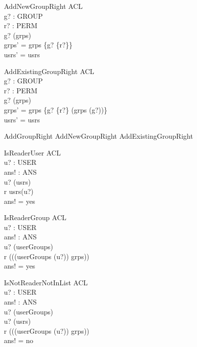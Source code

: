 \begin{schema}{AddNewGroupRight}
\Delta ACL \\
g? : GROUP \\ 
r? : PERM \\
\where 
g? \notin \dom (grps) \\
grps' = grps \oplus \{g? \mapsto \{r?\}\} \\
usrs' = usrs
\end{schema}

\begin{schema}{AddExistingGroupRight}
\Delta ACL \\
g? : GROUP \\ 
r? : PERM \\
\where 
g? \in \dom (grps) \\
grps' = grps \oplus \{g? \mapsto \{r?\} \cup (grps (g?))\} \\
usrs' = usrs
\end{schema}

\begin{zed}
AddGroupRight  AddNewGroupRight \lor AddExistingGroupRight
\end{zed}

\begin{schema}{IsReaderUser}
\Xi ACL \\
u? : USER \\
ans! : ANS \\
\where
u? \in \dom (usrs) \\ 
r \in usrs(u?) \\
ans! = yes
\end{schema}

\begin{schema}{IsReaderGroup}
\Xi ACL \\
u? : USER \\
ans! : ANS \\
\where
u? \in \dom (userGroups) \\ 
r \in \bigcup (\ran((userGroups (u?)) \dres grps)) \\
ans! = yes
\end{schema}

\begin{schema}{IsNotReaderNotInList} 
\Xi ACL \\
u? : USER \\
ans! : ANS \\
\where 
u? \in \dom (userGroups) \\ 
u? \notin \dom (usrs) \\
r \notin \bigcup (\ran((userGroups (u?)) \dres grps)) \\
ans! = no
\end{schema}

